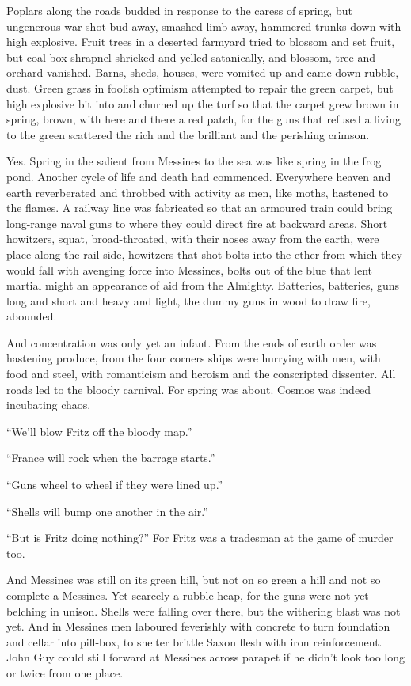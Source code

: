 Poplars along the roads budded in response to the caress of spring, but ungenerous war shot bud away, smashed limb away, hammered trunks down with high explosive. Fruit trees in a deserted farmyard tried to blossom and set fruit, but coal-box shrapnel shrieked and yelled satanically, and blossom, tree and orchard vanished. Barns, sheds, houses, were vomited up and came down rubble, dust. Green grass in foolish optimism attempted to repair the green carpet, but high explosive bit into and churned up the turf so that the carpet grew brown in spring, brown, with here and there a red patch, for the guns that refused a living to the green scattered the rich and the brilliant and the perishing crimson.

Yes. Spring in the salient from Messines to the sea was like spring in the frog pond. Another cycle of life and death had commenced. Everywhere heaven and earth reverberated and throbbed with activity as men, like moths, hastened to the flames. A railway line was fabricated so that an armoured train could bring long-range naval guns to where they could direct fire at backward areas. Short howitzers, squat, broad-throated, with their noses away from the earth, were place along the rail-side, howitzers that shot bolts into the ether from which they would fall with avenging force into Messines, bolts out of the blue that lent martial might an appearance of aid from the Almighty. Batteries, batteries, guns long and short and heavy and light, the dummy guns in wood to draw fire, abounded.

And concentration was only yet an infant. From the ends of earth order was hastening produce, from the four corners ships were hurrying with men, with food and steel, with romanticism and heroism and the conscripted dissenter. All roads led to the bloody carnival. For spring was about. Cosmos was indeed incubating chaos.

``We'll blow Fritz off the bloody map.''

``France will rock when the barrage starts.''

``Guns wheel to wheel if they were lined up.''

``Shells will bump one another in the air.''

``But is Fritz doing nothing?'' For Fritz was a tradesman at the game of murder too.

And Messines was still on its green hill, but not on so green a hill and not so complete a Messines. Yet scarcely a rubble-heap, for the guns were not yet belching in unison. Shells were falling over there, but the withering blast was not yet. And in Messines men laboured feverishly with concrete to turn foundation and cellar into pill-box, to shelter brittle Saxon flesh with iron reinforcement. John Guy could still forward at Messines across parapet if he didn't look too long or twice from one place.

